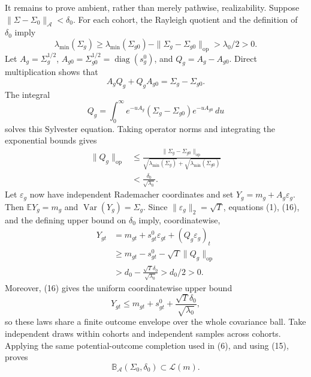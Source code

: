 It remains to prove ambient, rather than merely pathwise, realizability.  Suppose
\(\|\Sigma-\Sigma_0\|_{\mathcal A}<\delta_0\).  For each cohort, the Rayleigh quotient and the definition of \(\delta_0\) imply
\[
\lambda_{\min}(\Sigma_g)
\ge \lambda_{\min}(\Sigma_{g0})
-\|\Sigma_g-\Sigma_{g0}\|_{\mathrm{op}}
>\lambda_0/2>0.                                        \tag{15}
\]
Let \(A_g=\Sigma_g^{1/2}\), \(A_{g0}=\Sigma_{g0}^{1/2}=\operatorname{diag}(s_g^0)\), and \(Q_g=A_g-A_{g0}\).  Direct multiplication shows that
\[
A_gQ_g+Q_gA_{g0}=\Sigma_g-\Sigma_{g0}.
\]
The integral
\[
Q_g=\int_0^\infty
e^{-uA_g}(\Sigma_g-\Sigma_{g0})e^{-uA_{g0}}\,du
\]
solves this Sylvester equation.  Taking operator norms and integrating the exponential bounds gives
\[
\begin{aligned}
\|Q_g\|_{\mathrm{op}}
&\le
\frac{\|\Sigma_g-\Sigma_{g0}\|_{\mathrm{op}}}
{\sqrt{\lambda_{\min}(\Sigma_g)}+
 \sqrt{\lambda_{\min}(\Sigma_{g0})}}\\
&<\frac{\delta_0}{\sqrt{\lambda_0}}.                 \tag{16}
\end{aligned}
\]
Let \(\varepsilon_g\) now have independent Rademacher coordinates and set
\(Y_g=m_g+A_g\varepsilon_g\).  Then \(\mathbb E Y_g=m_g\) and
\(\operatorname{Var}(Y_g)=\Sigma_g\).  Since
\(\|\varepsilon_g\|_2=\sqrt T\), equations (1), (16), and the defining upper bound on \(\delta_0\) imply, coordinatewise,
\[
\begin{aligned}
Y_{gt}
&=m_{gt}+s^0_{gt}\varepsilon_{gt}+(Q_g\varepsilon_g)_t\\
&\ge m_{gt}-s^0_{gt}-\sqrt T\|Q_g\|_{\mathrm{op}}\\
&>d_0-\frac{\sqrt T\delta_0}{\sqrt{\lambda_0}}
>d_0/2>0.                                               \tag{17}
\end{aligned}
\]
Moreover, (16) gives the uniform coordinatewise upper bound
\[
Y_{gt}
\le m_{gt}+s^0_{gt}+\frac{\sqrt T\delta_0}{\sqrt{\lambda_0}},
\]
so these laws share a finite outcome envelope over the whole covariance ball.  Take independent draws within cohorts and independent samples across cohorts.  Applying the same potential-outcome completion used in (6), and using (15), proves
\[
\mathbb B_{\mathcal A}(\Sigma_0,\delta_0)
\subset\mathcal L(m).                                  \tag{18}
\]

